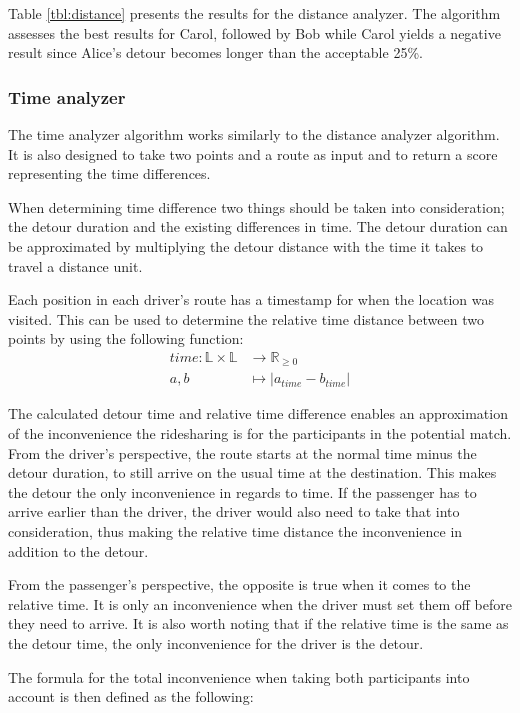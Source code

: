 Table \ref{tbl:distance} presents the results for the distance analyzer.
The algorithm assesses the best results for Carol, followed by Bob while Carol yields a negative result since Alice's detour becomes longer than the acceptable 25\%. 


\subsubsection{Time analyzer}
The time analyzer algorithm works similarly to the distance analyzer algorithm. 
It is also designed to take two points and a route as input and to return a score representing the time differences.

When determining time difference two things should be taken into consideration; the detour duration and the existing differences in time.
The detour duration can be approximated by multiplying the detour distance with the time it takes to travel a distance unit.

Each position in each driver's route has a timestamp for when the location was visited.
This can be used to determine the relative time distance between two points by using the following function:
\begin{align*}
	time : \mathbb{L}\times\mathbb{L} &\rightarrow \mathbb{R}_{\geq 0}\\
	a, b &\mapsto | a_{time} - b_{time} |
\end{align*}

The calculated detour time and relative time difference enables an approximation of the inconvenience the ridesharing is for the participants in the potential match.
From the driver's perspective, the route starts at the normal time minus the detour duration, to still arrive on the usual time at the destination.
This makes the detour the only inconvenience in regards to time.
If the passenger has to arrive earlier than the driver, the driver would also need to take that into consideration, thus making the relative time distance the inconvenience in addition to the detour.

From the passenger's perspective, the opposite is true when it comes to the relative time. 
It is only an inconvenience when the driver must set them off before they need to arrive. It is also worth noting that if the relative time is the same as the detour time, the only inconvenience for the driver is the detour.

The formula for the total inconvenience when taking both participants into account is then defined as the following:


